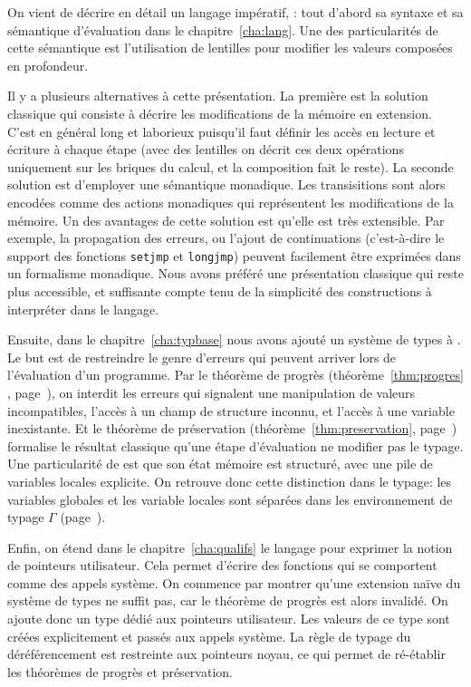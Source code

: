 On vient de décrire en détail un langage impératif, \langname: tout d'abord sa
syntaxe et sa sémantique d'évaluation dans le chapitre~\ref{cha:lang}. Une des
particularités de cette sémantique est l'utilisation de lentilles pour modifier
les valeurs composées en profondeur.

\label{page:ccl-II-monad}
Il y a plusieurs alternatives à cette présentation. La première est la solution
classique qui consiste à décrire les modifications de la mémoire en extension.
C'est en général long et laborieux puisqu'il faut définir les accès en lecture
et écriture à chaque étape (avec des lentilles on décrit ces deux opérations
uniquement sur les briques du calcul, et la composition fait le reste). La
seconde solution est d'employer une sémantique monadique. Les transisitions sont
alors encodées comme des actions monadiques qui représentent les modifications
de la mémoire. Un des avantages de cette solution est qu'elle est très
extensible. Par exemple, la propagation des erreurs, ou l'ajout de continuations
(c'est-à-dire le support des fonctions \texttt{setjmp} et \texttt{longjmp})
peuvent facilement être exprimées dans un formalisme monadique. Nous avons
préféré une présentation classique qui reste plus accessible, et suffisante
compte tenu de la simplicité des constructions à interpréter dans le langage.

Ensuite, dans le chapitre~\ref{cha:typbase} nous avons ajouté un système de
types à \langname. Le but est de restreindre le genre d'erreurs qui peuvent
arriver lors de l'évaluation d'un programme. Par le théorème de progrès
(théorème~\ref{thm:progres} , page~\pageref{thm:progres}), on interdit les
erreurs qui signalent une manipulation de valeurs incompatibles, l'accès à un
champ de structure inconnu, et l'accès à une variable inexistante. Et le
théorème de préservation (théorème~\ref{thm:preservation},
page~\pageref{thm:preservation}) formalise le résultat classique qu'une étape
d'évaluation ne modifier pas le typage.
Une particularité de \langname est que son état mémoire est structuré, avec une
pile de variables locales explicite. On retrouve donc cette distinction dans le
typage: les variables globales et les variable locales sont séparées dans les
environnement de typage $Γ$ (page~\pageref{page:gamma-split}).

Enfin, on étend dans le chapitre~\ref{cha:qualifs} le langage pour exprimer la
notion de pointeurs utilisateur. Cela permet d'écrire des fonctions qui se
comportent comme des appels système. On commence par montrer qu'une extension
naïve du système de types ne suffit pas, car le théorème de progrès est alors
invalidé. On ajoute donc un type dédié aux pointeurs utilisateur. Les valeurs de
ce type sont créées explicitement et passés aux appels système. La règle de
typage du déréférencement est restreinte aux pointeurs noyau, ce qui permet de
ré-établir les théorèmes de progrès et préservation.


